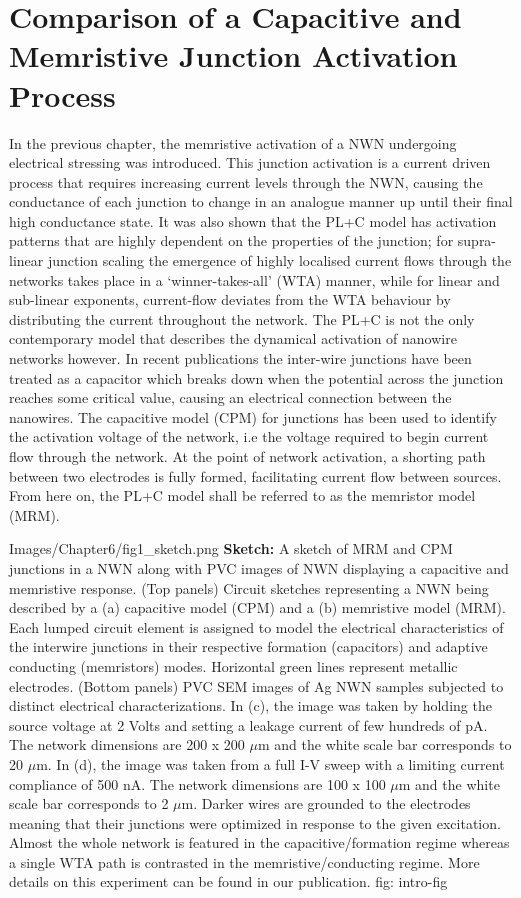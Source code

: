 \chapter{Comparison of a Capacitive and Memristive Junction Activation Process}
In the previous chapter, the memristive activation of a NWN undergoing electrical stressing was introduced. This junction activation is a current driven process that requires increasing current levels through the NWN, causing the conductance of each junction to change in an analogue manner up until their final high conductance state. It was also shown that the PL+C model has activation patterns that are highly dependent on the properties of the junction; for supra-linear junction scaling the emergence of highly localised current flows through the networks takes place in a `winner-takes-all' (WTA) manner, while for linear and sub-linear exponents, current-flow deviates from the WTA behaviour by distributing the current throughout the network. The PL+C is not the only contemporary model that describes the dynamical activation of nanowire networks however. In recent publications the inter-wire junctions have been treated as a capacitor which breaks down when the potential across the junction reaches some critical value, causing an electrical connection between the nanowires\cite{nirmalraj2012,fairfield2014,fairfield2016}. The capacitive model (CPM) for junctions has been used to identify the activation voltage of the network, i.e the voltage required to begin current flow through the network. At the point of network activation, a shorting path between two electrodes is fully formed, facilitating current flow between sources. From here on, the PL+C model shall be referred to as the memristor model (MRM).

{Images/Chapter6/fig1_sketch.png}
{\textbf{Sketch:} A sketch of MRM and CPM junctions in a NWN along with PVC images of NWN displaying a capacitive and memristive response.}
{(Top panels) Circuit sketches representing a NWN being described by a (a) capacitive model (CPM) and a (b) memristive model (MRM). Each lumped circuit element is assigned to model the electrical characteristics of the interwire junctions in their respective formation (capacitors) and adaptive conducting (memristors) modes. Horizontal green lines represent metallic electrodes. (Bottom panels) PVC SEM images of Ag NWN samples subjected to distinct electrical characterizations. In (c), the image was taken by holding the source voltage at 2 Volts and setting a leakage current of few hundreds of pA. The network dimensions are 200 x 200 $\mu$m and the white scale bar corresponds to 20 $\mu$m. In (d), the image was taken from a full I-V sweep with a limiting current compliance of 500 nA. The network dimensions are 100 x 100 $\mu$m and the white scale bar corresponds to 2 $\mu$m. Darker wires are grounded to the electrodes meaning that their junctions were optimized in response to the given excitation. Almost the whole network is featured in the capacitive/formation regime whereas a single WTA path is contrasted in the memristive/conducting regime\cite{ocallaco2018}. More details on this experiment can be found in our publication\cite{ocallaco2018}.}
{fig: intro-fig}

